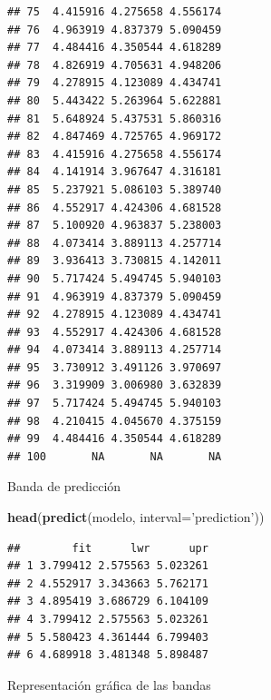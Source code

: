 \documentclass[]{book}
\newenvironment{Shaded}{\begin{snugshade}}{\end{snugshade}}
\newcommand{\DataTypeTok}[1]{\textcolor[rgb]{0.13,0.29,0.53}{#1}}
\newcommand{\KeywordTok}[1]{\textcolor[rgb]{0.13,0.29,0.53}{\textbf{#1}}}
\newcommand{\NormalTok}[1]{#1}
\newcommand{\StringTok}[1]{\textcolor[rgb]{0.31,0.60,0.02}{#1}}
\begin{document}
\begin{verbatim}
## 75  4.415916 4.275658 4.556174
## 76  4.963919 4.837379 5.090459
## 77  4.484416 4.350544 4.618289
## 78  4.826919 4.705631 4.948206
## 79  4.278915 4.123089 4.434741
## 80  5.443422 5.263964 5.622881
## 81  5.648924 5.437531 5.860316
## 82  4.847469 4.725765 4.969172
## 83  4.415916 4.275658 4.556174
## 84  4.141914 3.967647 4.316181
## 85  5.237921 5.086103 5.389740
## 86  4.552917 4.424306 4.681528
## 87  5.100920 4.963837 5.238003
## 88  4.073414 3.889113 4.257714
## 89  3.936413 3.730815 4.142011
## 90  5.717424 5.494745 5.940103
## 91  4.963919 4.837379 5.090459
## 92  4.278915 4.123089 4.434741
## 93  4.552917 4.424306 4.681528
## 94  4.073414 3.889113 4.257714
## 95  3.730912 3.491126 3.970697
## 96  3.319909 3.006980 3.632839
## 97  5.717424 5.494745 5.940103
## 98  4.210415 4.045670 4.375159
## 99  4.484416 4.350544 4.618289
## 100       NA       NA       NA
\end{verbatim}

Banda de predicción

\begin{Shaded}
\begin{Highlighting}[]
\KeywordTok{head}\NormalTok{(}\KeywordTok{predict}\NormalTok{(modelo, }\DataTypeTok{interval=}\StringTok{'prediction'}\NormalTok{))}
\end{Highlighting}
\end{Shaded}

\begin{verbatim}
##        fit      lwr      upr
## 1 3.799412 2.575563 5.023261
## 2 4.552917 3.343663 5.762171
## 3 4.895419 3.686729 6.104109
## 4 3.799412 2.575563 5.023261
## 5 5.580423 4.361444 6.799403
## 6 4.689918 3.481348 5.898487
\end{verbatim}

Representación gráfica de las bandas
\end{document}
